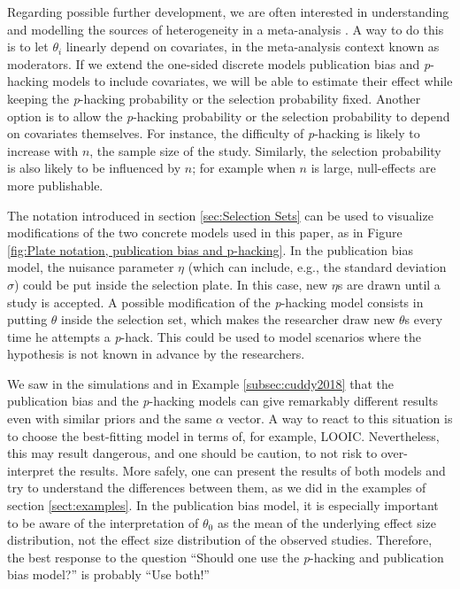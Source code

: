 \documentclass{article}
\theoremstyle{plain}
\theoremstyle{definition}
\begin{document}
Regarding possible further development, we are often interested in understanding and modelling the sources of heterogeneity in a meta-analysis \citep{thompson1994systematic}. A way to do this is to let $\theta_{i}$ linearly depend on covariates, in the meta-analysis context known as moderators. If we extend the one-sided discrete models publication bias and \textit{p}-hacking models to include covariates, we will be able to estimate their effect while keeping the \textit{p}-hacking probability or the selection probability fixed. Another option is to allow the \textit{p}-hacking probability or the selection probability to depend on covariates themselves. For instance, the difficulty of \textit{p}-hacking is likely to increase with $n$, the sample size of the study. Similarly, the selection probability is also likely to be influenced by $n$; for example when $n$ is large, null-effects are more publishable.

The notation introduced in section \ref{sec:Selection Sets} can be used to visualize modifications of the two concrete models used in this paper, as in Figure \ref{fig:Plate notation, publication bias and p-hacking}. In the publication bias model, the nuisance parameter $\eta$ (which can include, e.g., the standard deviation $\sigma$) could be put inside the selection plate. In this case, new $\eta$s are drawn until a study is accepted. A possible modification of the \textit{p}-hacking model consists in putting $\theta$ inside the selection set, which makes the researcher draw new $\theta$s every time he attempts a \textit{p}-hack. This could be used to model scenarios where the hypothesis is not
known in advance by the researchers.

We saw in the simulations and in Example \ref{subsec:cuddy2018} that the publication bias and the \textit{p}-hacking models can give remarkably different results even with similar priors and the same $\alpha$ vector. A way to react to this situation is to choose the best-fitting model in terms of, for example, LOOIC. Nevertheless, this may result dangerous, and one should be caution, to not risk to over-interpret the results. More safely, one can present the results of both models and try to understand the differences between them, as we did in the examples of section \ref{sect:examples}. In the publication bias model, it is especially important to be aware of the interpretation of $\theta_{0}$ as the mean of the underlying effect size distribution, not the effect size distribution of the observed studies. Therefore, the best response to the question \enquote{Should one use the \textit{p}-hacking and publication bias model?} is probably \enquote{Use both!}
\end{document}
